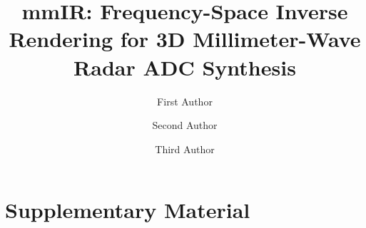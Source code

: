 \documentclass[runningheads]{llncs}
\begin{document}
\title{mmIR: Frequency-Space Inverse Rendering for 3D Millimeter-Wave Radar ADC Synthesis}


\author{First Author \and
Second Author \and
Third Author}



\maketitle








\clearpage
\appendix
\section*{Supplementary Material}
\setcounter{section}{0}
\renewcommand{\thesection}{\Alph{section}}







\end{document}
